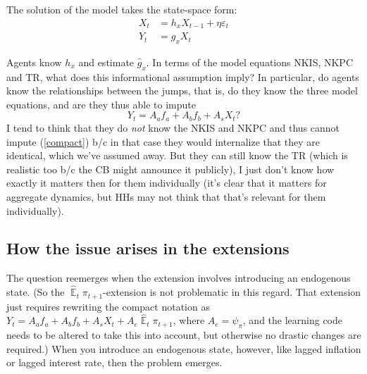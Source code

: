 \documentclass[11pt]{article}
\renewcommand{\[}{\begin{equation}}
\renewcommand{\]}{\end{equation}}
\DeclareMathOperator{\E}{\mathbb{E}}
\begin{document}
The solution of the model takes the state-space form:
\begin{align}
X_t & = h_x X_{t-1} + \eta \varepsilon_t \label{state_eq}\\
Y_t & = g_x X_t \label{obs_eq}
\end{align}

Agents know $h_x$ and estimate $\hat{g}_x$. In terms of the model equations NKIS, NKPC and TR, what does this informational assumption imply? In particular, do agents know the relationships between the jumps, that is, do they know the three model equations, and are they thus able to impute
\begin{equation}
Y_t = A_a f_a + A_b f_b + A_s X_t ? \label{compact}
\end{equation}
I tend to think that they do \emph{not} know the NKIS and NKPC and thus cannot impute (\ref{compact}) b/c in that case they would internalize that they are identical, which we've assumed away. But they can still know the TR (which is realistic too b/c the CB might announce it publicly), I just don't know how exactly it matters then for them individually (it's clear that it matters for aggregate dynamics, but HHs may not think that that's relevant for them individually).
\subsection{How the issue arises in the extensions }
The question reemerges when the extension involves introducing an endogenous state. (So the $\hat{\E}_t\pi_{t+1}$-extension is not problematic in this regard. That extension just requires rewriting the compact notation as $Y_t = A_a f_a + A_b f_b + A_s X_t +A_e\hat{\E}_t\pi_{t+1}$, where $A_e = \psi_{\pi}$, and the learning code needs to be altered to take this into account, but otherwise no drastic changes are required.)
When you introduce an endogenous state, however, like lagged inflation or lagged interest rate, then the problem emerges. 
\end{document}

